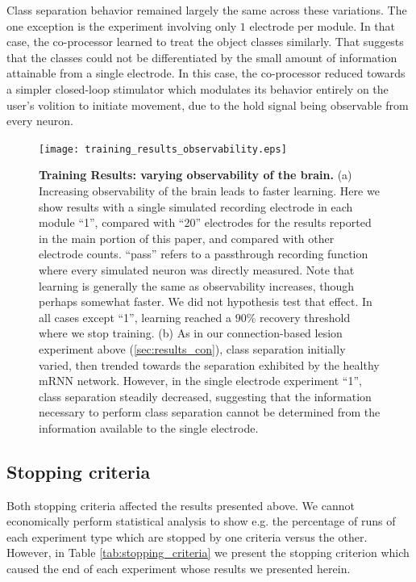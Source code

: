 \documentclass[12pt]{iopart}
\begin{document}
Class separation behavior remained largely the same across these variations.
The one exception is the experiment involving only $1$ electrode per module.
In that case, the co-processor learned to treat the object classes
similarly. That suggests that the classes could not be differentiated by
the small amount of information attainable from a single electrode. In this
case, the co-processor reduced towards a simpler closed-loop stimulator
which modulates its behavior entirely on the user's volition to initiate
movement, due to the hold signal being observable from every neuron.

\begin{figure}[h!]
\centering
\texttt{[image: training\_results\_observability.eps]}
\caption{\textbf{Training Results: varying observability of the brain.}
         (a) Increasing observability of the brain leads to faster learning. Here
         we show results with a single simulated recording electrode in each module
         ``1'', compared with ``20'' electrodes for the results reported in the main
         portion of this paper, and compared with other electrode counts. ``pass''
         refers to a passthrough recording function where every simulated neuron was
         directly measured. Note that learning is generally the same as observability
         increases, though perhaps somewhat faster. We did not hypothesis test that effect.
         In all cases except ``1'', learning reached a $90\%$ recovery threshold where
         we stop training. (b) As in our connection-based lesion experiment above
         (\ref{sec:results_con}), class separation initially varied, then trended towards the
         separation exhibited by the healthy mRNN network. However, in
         the single electrode experiment ``1'', class separation steadily decreased, suggesting
         that the information necessary to perform class separation cannot be determined from
         the information available to the single electrode.}
\label{fig:results_observability}
\end{figure}

\subsection{Stopping criteria}
\label{sup:stopping_criteria}

Both stopping criteria affected the results presented above. We cannot economically perform
statistical analysis to show e.g. the percentage of runs of each experiment type which
are stopped by one criteria versus the other. However, in Table \ref{tab:stopping_criteria}
we present the stopping criterion which caused the end of each experiment whose results
we presented herein.
\end{document}

